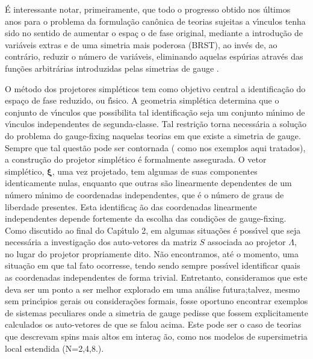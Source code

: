 \documentclass[a4paper,thmsa,12pt]{report}
\begin{document}
\'{E} interessante notar, primeiramente, que todo o progresso obtido nos
\'{u}ltimos anos para o problema da formula\c{c}\~{a}o can\^{o}nica de
teorias sujeitas a v\'{\i}nculos tenha sido no sentido de aumentar o espa\c{c}%
o de fase original, mediante a introdu\c{c}\~{a}o de vari\'{a}veis extras e
de uma simetria mais poderosa (BRST), ao inv\'{e}s de, ao contr\'{a}rio,
reduzir o n\'{u}mero de vari\'{a}veis, eliminando aquelas esp\'{u}rias
atrav\'{e}s das fun\c{c}\~{o}es arbitr\'{a}rias introduzidas pelas simetrias
de gauge \cite{teitelboim}.

O m\'{e}todo dos projetores simpl\'{e}ticos tem como objetivo central a
identifica\c{c}\~{a}o do espa\c{c}o de fase reduzido, ou f\'{\i}sico. A
geometria simpl\'{e}tica determina que o conjunto de v\'{\i}nculos que
possibilita tal identifica\c{c}\~{a}o seja um conjunto m\'{\i}nimo de
v\'{\i}nculos independentes de segunda-classe. Tal restri\c{c}\~{a}o torna
necess\'{a}ria a solu\c{c}\~{a}o do problema do gauge-fixing naquelas
teorias em que existe a simetria de gauge. Sempre que tal quest\~{a}o pode
ser contornada ( como nos exemplos aqui tratados), a constru\c{c}\~{a}o do
projetor simpl\'{e}tico \'{e} formalmente assegurada. O vetor
simpl\'{e}tico, $\mathbf{\xi }$, uma vez projetado, tem algumas de suas
componentes identicamente nulas, enquanto que outras s\~{a}o linearmente
dependentes de um n\'{u}mero m\'{\i}nimo de coordenadas independentes, que
\'{e} o n\'{u}mero de graus de liberdade presentes. Esta identifica\c{c}%
\~{a}o das coordenadas linearmente independentes depende fortemente da
escolha das condi\c{c}\~{o}es de gauge-fixing. Como discutido ao final do
Cap\'{\i}tulo 2, em algumas situa\c{c}\~{o}es \'{e} poss\'{\i}vel que seja
necess\'{a}ria a investiga\c{c}\~{a}o dos auto-vetores da matriz $S$
associada ao projetor $\Lambda $, no lugar do projetor propriamente dito.
N\~{a}o encontramos, at\'{e} o momento, uma situa\c{c}\~{a}o em que tal fato
ocorresse, tendo sendo sempre poss\'{\i}vel identificar quais as coordenadas
independentes de forma trivial. Entretanto, consideramos que este deva ser
um ponto a ser melhor explorado em uma an\'{a}lise futura;talvez, mesmo sem
princ\'{\i}pios gerais ou considera\c{c}\~{o}es formais, fosse oportuno
encontrar exemplos de sistemas peculiares onde a simetria de gauge pedisse
que fossem explicitamente calculados os auto-vetores de que se falou acima.
Este pode ser o caso de teorias que descrevam spins mais altos em intera\c{c}%
\~{a}o, como nos modelos de supersimetria local estendida (N=2,4,8.).
\end{document}
